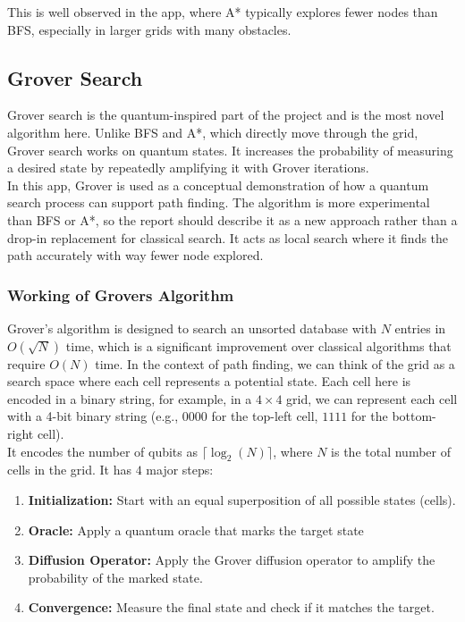 \documentclass[12pt,a4paper]{article}
\begin{document}
\noindent This is well observed in the app, where A* typically explores fewer nodes than BFS, especially in larger grids with many obstacles.


\subsection{Grover Search}
Grover search is the quantum-inspired part of the project and is the most novel algorithm here. 
Unlike BFS and A*, which directly move through the grid, Grover search works on quantum states. 
It increases the probability of measuring a desired state by repeatedly amplifying it with Grover iterations. \\

\noindent In this app, Grover is used as a conceptual demonstration of how a quantum search process can support path finding. 
The algorithm is more experimental than BFS or A*, so the report should describe it as a new approach rather than a drop-in replacement for classical search.
It acts as local search where it finds the path accurately with way fewer node explored.

\subsubsection{Working of Grovers Algorithm}
Grover's algorithm is designed to search an unsorted database with $N$ entries in $O(\sqrt{N})$ time, which is a significant improvement over classical algorithms that require $O(N)$ time.
In the context of path finding, we can think of the grid as a search space where each cell represents a potential state.
Each cell here is encoded in a binary string, for example, in a $4 \times 4$ grid, we can represent each cell with a 4-bit binary string (e.g., $0000$ for the top-left cell, $1111$ for the bottom-right cell). \\

\noindent It encodes the number of qubits as $\lceil \log_2(N) \rceil$, where $N$ is the total number of cells in the grid.
It has $4$ major steps:
\begin{enumerate}
    \item \textbf{Initialization:} Start with an equal superposition of all possible states (cells).
    \item \textbf{Oracle:} Apply a quantum oracle that marks the target state
    \item \textbf{Diffusion Operator:} Apply the Grover diffusion operator to amplify the probability of the marked state.
    \item \textbf{Convergence:} Measure the final state and check if it matches the target.
\end{enumerate}
\end{document}
